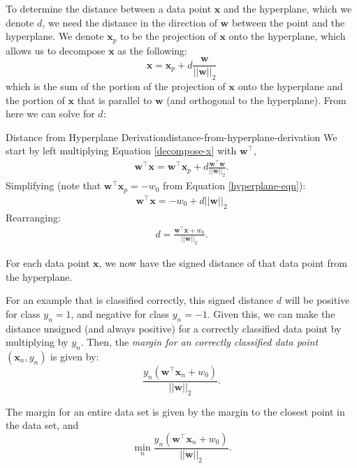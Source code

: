 To determine the distance between a data point $\textbf{x}$ and the hyperplane, which we denote $d$, we need the distance in the direction of $\textbf{w}$ between the point and the hyperplane. We denote $\textbf{x}_{p}$ to be the projection of $\textbf{x}$ onto the hyperplane, which allows us to decompose $\textbf{x}$ as the following:
\begin{equation} \label{decompose-x}
	\textbf{x} = \textbf{x}_{p} + d \frac{\textbf{w}}{|| \textbf{w} ||_2}
\end{equation}
which is the sum of the portion of the projection of $\textbf{x}$ onto the hyperplane and the portion of $\textbf{x}$ that is parallel to $\textbf{w}$ (and orthogonal to the hyperplane). From here we can solve for $d$:
%
\begin{derivation}{Distance from Hyperplane Derivation}{distance-from-hyperplane-derivation}
	We start by left multiplying Equation \ref{decompose-x} with $\textbf{w}^\top$,
	\begin{align*}
		\textbf{w}^\top\textbf{x} = \textbf{w}^\top\textbf{x}_{p} + d \frac{\textbf{w}^\top\textbf{w}}{||\textbf{w}||_2}.
	\end{align*}
	Simplifying (note that $\textbf{w}^\top\textbf{x}_{p} = -w_{0}$ from Equation \ref{hyperplane-eqn}):
	\begin{align*}
		\textbf{w}^\top\textbf{x} =  - w_{0} + d ||\textbf{w}||_2
	\end{align*}
	Rearranging:
	\begin{align*}
		d = \frac{\textbf{w}^\top\textbf{x} + w_{0}}{||\textbf{w}||_2}.
	\end{align*}
\end{derivation}

For each data point $\textbf{x}$, we now have the signed distance of that data point from the hyperplane.

For an example that is classified correctly, this signed distance $d$ will be positive for class $y_n = 1$, and negative for class $y_n = -1$.  Given this, we can make the distance unsigned (and always   positive) for a correctly classified data point by multiplying by $y_n$. Then, the {\em margin for an correctly classified data point $(\textbf{x}_{n},y_n)$} is given by:
\begin{equation} \label{individual-margin}
	\frac{y_{n}(\textbf{w}^\top\textbf{x}_{n} + w_{0})}{||\textbf{w}||_2}.
      \end{equation}
      
      The margin for an entire data set is given by the margin to the closest point in the data set,  and
\begin{equation} \label{total-margin}
	\min_{n} \frac{y_{n}(\textbf{w}^\top\textbf{x}_{n} + w_{0})}{||\textbf{w}||_2}.
\end{equation}

